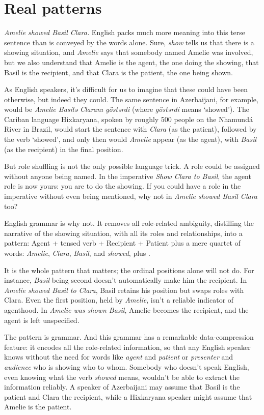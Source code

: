 \chapter{Real patterns}

\textit{Amelie showed Basil Clara.} English packs much more meaning into this terse sentence than is conveyed by the words alone. Sure, \textit{show} tells us that there is a showing situation, and \textit{Amelie} says that somebody named Amelie was involved, but we also understand that Amelie is the agent, the one doing the showing, that Basil is the recipient, and that Clara is the patient, the one being shown.

As English speakers, it's difficult for us to imagine that these could have been otherwise, but indeed they could. The same sentence in Azerbaijani, for example, would be \textit{Amelie Basilə Claranı göstərdi} (where \textit{göstərdi} means `showed'). The Cariban language Hixkaryana, spoken by roughly 500 people on the Nhamundá River in Brazil, would start the sentence with \textit{Clara} (as the patient), followed by the verb `showed', and only then would \textit{Amelie} appear (as the agent), with \textit{Basil} (as the recipient) in the final position.

But role shuffling is not the only possible language trick. A role could be assigned without anyone being named. In the imperative \textit{Show Clara to Basil}, the agent role is now yours: you are to do the showing. If you could have a role in the imperative without even being mentioned, why not in \textit{Amelie showed Basil Clara} too?

English grammar is why not. It removes all role-related ambiguity, distilling the narrative of the showing situation, with all its roles and relationships, into a pattern: \textsf{Agent + tensed verb + Recipient + Patient} plus a mere quartet of words: \textit{Amelie}, \textit{Clara}, \textit{Basil}, and \textit{showed}, plus .

It is the whole pattern that matters; the ordinal positions alone will not do. For instance, \textit{Basil} being second doesn't automatically make him the recipient. In \textit{Amelie showed Basil to Clara}, Basil retains his position but swaps roles with Clara. Even the first position, held by \textit{Amelie}, isn't a reliable indicator of agenthood. In \textit{Amelie was shown Basil}, Amelie becomes the recipient, and the agent is left unspecified.

The pattern is grammar. And this grammar has a remarkable data-compression feature: it encodes all the role-related information, so that any English speaker knows without the need for words like \textit{agent} and \textit{patient} or \textit{presenter} and \textit{audience} who is showing who to whom. Somebody who doesn't speak English, even knowing what the verb \textit{showed} means, wouldn't be able to extract the information reliably. A speaker of Azerbaijani may assume that Basil is the patient and Clara the recipient, while a Hixkaryana speaker might assume that Amelie is the patient.

